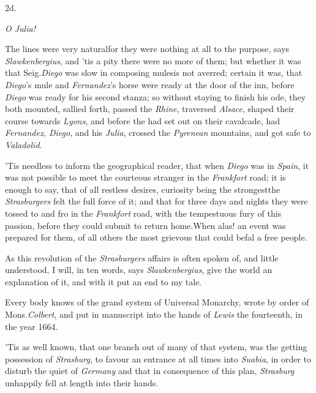\documentclass{article}
\begin{document}
\medskip
\centerline{2d.}
\parskip
\bgroup\itshape\small\noindent
\null\qquad O Julia!
\par\egroup
{}
\newpage
The lines were very natural\tsk for they were nothing
at all to the purpose, says \textit{Slawkenbergius}, and ’tis a
pity there were no more of them; but whether it was that
Seig.\@ \textit{Diego} was slow in composing  mules\tsk is not averred; certain it
was, that \textit{Diego}’s mule and \textit{Fernandez}’s
horse were ready at the door of the inn, before \textit{Diego} was
ready for his second stanza; so without staying to finish his ode,
they both mounted, sallied forth, passed the \textit{Rhine}, traversed
\textit{Alsace}, shaped their\break 
course towards \textit{Lyons}, and before the\break
{} had
set out on their cavalcade, had \textit{Fernandez, Diego}, and his
\textit{Julia}, crossed the \textit{Pyrenean} mountains, and got safe
to\break
\textit{Valadolid.}

\newpage
’Tis needless to inform the geographical reader, that when
\textit{Diego} was in \textit{Spain}, it was not possible to meet the
courteous stranger in the \textit{Frankfort} road; it is enough to
say, that of all restless desires, curiosity being the
strongest\tsk the \textit{Strasburgers} felt the full force
of it; and that for three days and nights they were tossed to and
fro in the \textit{Frankfort} road, with the tempestuous fury of this
passion, before they could submit to return home.\tsk When
alas! an event was prepared for them, of all others the most
grievous that could befal a free people.

As this revolution of the \textit{Strasburgers} affairs is often
spoken of, and little understood, I will, in ten words, says
\textit{Slawkenbergius}, give the world an explanation of it, and with it put an end to my tale.

\newpage
Every body knows of the grand system of Universal Monarchy,
wrote by\break
order of Mons.\@ \textit{Colbert}, and put in ma\-nuscript into
the hands of \textit{Lewis} the fourteenth, in the year 1664.

’Tis as well known, that one branch out of many of that
system, was the\break
getting possession of \textit{Strasburg}, to favour
an entrance at all times into \textit{Suabia}, in\break
order to disturb the quiet of \textit{Germany}\tsh\break
and that in consequence of this plan,\break
\textit{Strasburg} unhappily fell at length into their
hands.
\end{document}
